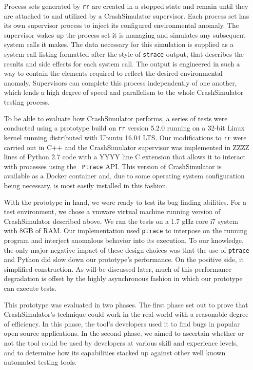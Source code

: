 Process sets generated by {\tt rr} are created in a stopped state and
remain until they are attached to and utilized by a CrashSimulator
supervisor.  Each process set has its own supervisor process to inject
its configured environmental anomaly.  The
supervisor wakes up the process set it is managing and simulates any
subsequent system calls it makes.  The data necessary for this
simulation is
supplied as a system call listing formatted after the style of {\tt strace}
output, that describes the results and side effects for each system
call. The output is engineered in such a way to contain the
elements required to reflect the
desired environmental anomaly.  Supervisors can complete this
process independently of one another, which lends a
high degree of speed and
parallelism to the whole CrashSimulator testing process.

To be able to evaluate how CrashSimulator performs, a series of tests were
conducted using a prototype build on {\tt rr} version 5.2.0 running on a
32-bit Linux kernel running distributed with  Ubuntu 16.04 LTS.  Our
modifications to {\tt rr} were carried out in C++ and the CrashSimulator
supervisor was implemented in ZZZZ lines of Python 2.7 code with a YYYY
line C extension that allows it to interact with processes using the {\tt
Ptrace} API.  This version of CrashSimulator is available as a Docker
container and, due to some operating system configuration being necessary,
is most easily installed in this fashion.

With the prototype in hand, we were ready to test its bug finding
abilities.  For a test environment, we chose
a vmware virtual machine running version of CrashSimulator described above.
We ran the tests on a 1.7 gHz
core i7 system with 8GB of RAM. Our implementation used {\tt ptrace} to
interpose on the running program and interject anomalous behavior into its
execution.  To our knowledge, the only major negative impact of
these design choices was that the use of {\tt ptrace} and Python did slow
down our
prototype's performance.  On the positive side, it simplified construction.
As will be discussed later, much of this performance
degradation is offset by the highly asynchronous fashion in which our
prototype can execute tests.

This prototype was evaluated in two phases.  The first phase set out to
prove that CrashSimulator's technique could work in the real world with a
reasonable degree of efficiency.  In this phase, the tool's developers used
it to find bugs in popular open source applications.  In the second phase,
we aimed to ascertain whether or not the tool could be used by developers
at various skill and experience levels, and to determine how its
capabilities stacked up against other well known automated testing tools.
